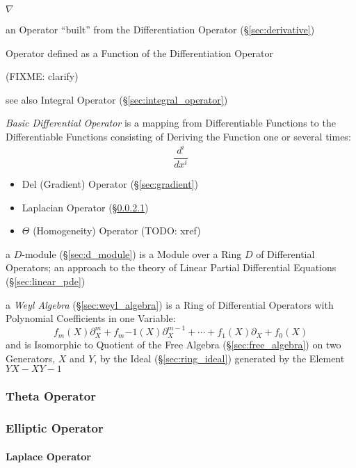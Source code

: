$\nabla$

an Operator ``built'' from the Differentiation Operator (\S\ref{sec:derivative})

Operator defined as a Function of the Differentiation Operator

(FIXME: clarify)

\fist see also Integral Operator (\S\ref{sec:integral_operator})

\emph{Basic Differential Operator} is a mapping from Differentiable Functions
to the Differentiable Functions consisting of Deriving the Function one or
several times:
\[
  \frac{d^i}{dx^i}
\]

\begin{itemize}
  \item Del (Gradient) Operator (\S\ref{sec:gradient})
  \item Laplacian Operator (\S\ref{sec:laplace_operator})
  \item $\Theta$ (Homogeneity) Operator (TODO: xref)
\end{itemize}

\fist a $D$-module (\S\ref{sec:d_module}) is a Module over a Ring $D$ of
Differential Operators; an approach to the theory of Linear Partial Differential
Equations (\S\ref{sec:linear_pde})

\fist a \emph{Weyl Algebra} (\S\ref{sec:weyl_algebra}) is a Ring of
Differential Operators with Polynomial Coefficients in one Variable:
\[
  f_m(X)\partial^m_X + f_m{-1}(X)\partial^{m-1}_X + \cdots +
    f_1(X)\partial_X + f_0(X)
\]
and is Isomorphic to Quotient of the Free Algebra (\S\ref{sec:free_algebra}) on
two Generators, $X$ and $Y$, by the Ideal (\S\ref{sec:ring_ideal}) generated by
the Element $YX - XY - 1$



\subsubsection{Theta Operator}\label{sec:theta_operator}

\subsubsection{Elliptic Operator}\label{sec:elliptic_operator}

\paragraph{Laplace Operator}\label{sec:laplace_operator}\hfill

